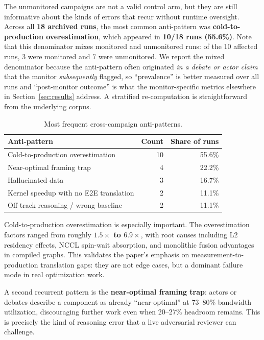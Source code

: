 \documentclass[11pt]{article}
\begin{document}
The unmonitored campaigns are not a valid control arm, but they are still informative about the kinds of errors that recur without runtime oversight. Across all \textbf{18 archived runs}, the most common anti-pattern was \textbf{cold-to-production overestimation}, which appeared in \textbf{10/18 runs (55.6\%)}. Note that this denominator mixes monitored and unmonitored runs: of the 10 affected runs, 3 were monitored and 7 were unmonitored. We report the mixed denominator because the anti-pattern often originated \emph{in a debate or actor claim} that the monitor \emph{subsequently} flagged, so ``prevalence'' is better measured over all runs and ``post-monitor outcome'' is what the monitor-specific metrics elsewhere in Section~\ref{sec:results} address. A stratified re-computation is straightforward from the underlying corpus.

\begin{table}[h]
\centering
\caption{Most frequent cross-campaign anti-patterns.}
\label{tab:antipatterns}
\small
\begin{tabular}{@{}lrr@{}}
\toprule
\textbf{Anti-pattern} & \textbf{Count} & \textbf{Share of runs} \\
\midrule
Cold-to-production overestimation & 10 & 55.6\% \\
Near-optimal framing trap & 4 & 22.2\% \\
Hallucinated data & 3 & 16.7\% \\
Kernel speedup with no E2E translation & 2 & 11.1\% \\
Off-track reasoning / wrong baseline & 2 & 11.1\% \\
\bottomrule
\end{tabular}
\end{table}

Cold-to-production overestimation is especially important. The overestimation factors ranged from roughly \textbf{$1.5\times$ to $6.9\times$}, with root causes including L2 residency effects, NCCL spin-wait absorption, and monolithic fusion advantages in compiled graphs. This validates the paper's emphasis on measurement-to-production translation gaps: they are not edge cases, but a dominant failure mode in real optimization work.

A second recurrent pattern is the \textbf{near-optimal framing trap}: actors or debates describe a component as already ``near-optimal'' at 73--80\% bandwidth utilization, discouraging further work even when 20--27\% headroom remains. This is precisely the kind of reasoning error that a live adversarial reviewer can challenge.
\end{document}
